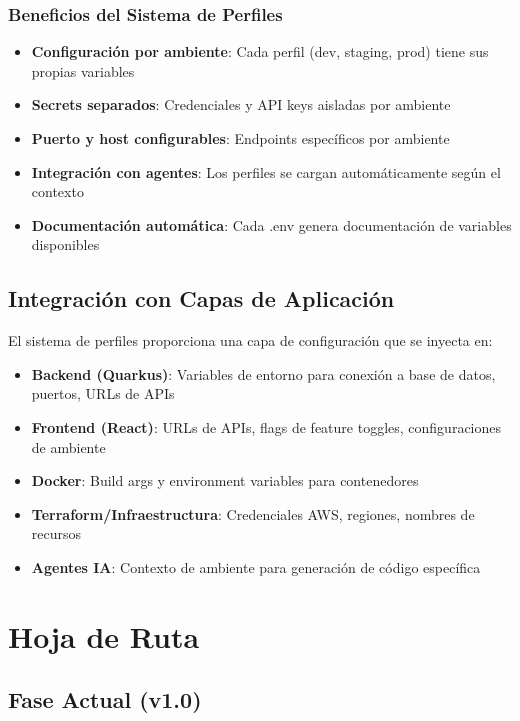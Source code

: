 \documentclass[12pt,a4paper,spanish]{article}
\begin{document}
\subsubsection{Beneficios del Sistema de Perfiles}

\begin{itemize}
    \item \textbf{Configuración por ambiente}: Cada perfil (dev, staging, prod) tiene sus propias variables
    \item \textbf{Secrets separados}: Credenciales y API keys aisladas por ambiente
    \item \textbf{Puerto y host configurables}: Endpoints específicos por ambiente
    \item \textbf{Integración con agentes}: Los perfiles se cargan automáticamente según el contexto
    \item \textbf{Documentación automática}: Cada .env genera documentación de variables disponibles
\end{itemize}

\subsection{Integración con Capas de Aplicación}

El sistema de perfiles proporciona una capa de configuración que se inyecta en:

\begin{itemize}
    \item \textbf{Backend (Quarkus)}: Variables de entorno para conexión a base de datos, puertos, URLs de APIs
    \item \textbf{Frontend (React)}: URLs de APIs, flags de feature toggles, configuraciones de ambiente
    \item \textbf{Docker}: Build args y environment variables para contenedores
    \item \textbf{Terraform/Infraestructura}: Credenciales AWS, regiones, nombres de recursos
    \item \textbf{Agentes IA}: Contexto de ambiente para generación de código específica
\end{itemize}

\newpage

\section{Hoja de Ruta}

\subsection{Fase Actual (v1.0)}
\end{document}
